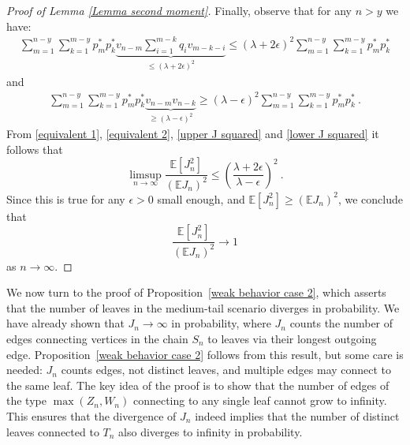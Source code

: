 \documentclass[12pt]{article}
\newcommand{\E}{\mathbb{E}}
\numberwithin{equation}{section} \font\titre=cmbx12
\begin{document}
\begin{proof}[Proof of Lemma \ref{Lemma second moment}]
\noindent Finally, observe that for any $n> y$ we have:
\begin{align}
\sum_{m=1}^{n-y}\sum_{k=1}^{m-y} p_m^*p_k^*\underbrace{v_{n-m}\sum_{i=1}^{m-k} q_i v_{m-k-i}}_{\le (\lambda + 2\epsilon)^2} \le (\lambda +2\epsilon)^2\sum_{m=1}^{n-y}\sum_{k=1}^{m-y} p_m^*p_k^* \label{upper J squared}
\end{align}
and
\begin{align}
    \sum_{m=1}^{n-y}\sum_{k=1}^{m-y} p_m^*p_k^*\underbrace{v_{n-m}v_{n-k}}_{\ge (\lambda - \epsilon)^2} \ge (\lambda - \epsilon)^2\sum_{m=1}^{n-y}\sum_{k=1}^{m-y} p_m^*p_k^*~. \label{lower J squared}
\end{align}
From \eqref{equivalent 1}, \eqref{equivalent 2}, \eqref{upper J squared} and \eqref{lower J squared} it follows that
$$\limsup_{n\to \infty} \frac{\E[J_n^2]}{(\E J_n)^2}\le \left( \frac{\lambda + 2\epsilon}{\lambda - \epsilon}\right)^2 ~.$$
Since this is true for any $\epsilon>0$ small enough, and $\E[J_n^2]\ge (\E J_n)^2$, we conclude that $$\frac{\E [J_n^2]}{(\E J_n)^2}\to 1$$
as $n \to \infty$.\end{proof}

\color{black}
We now turn to the proof of Proposition~\ref{weak behavior case 2}, which asserts that the number of leaves in the medium-tail scenario diverges in probability. We have already shown that $J_n \to \infty$ in probability, where $J_n$ counts the number of edges connecting vertices in the chain $S_n$ to leaves via their longest outgoing edge. Proposition~\ref{weak behavior case 2} follows from this result, but some care is needed: $J_n$ counts edges, not distinct leaves, and multiple edges may connect to the same leaf. The key idea of the proof is to show that the number of edges of the type $\max(Z_n,W_n)$ connecting to any single leaf cannot grow to infinity. This ensures that the divergence of $J_n$ indeed implies that the number of distinct leaves connected to $T_n$ also diverges to infinity in probability.
\color{black}
\end{document}
